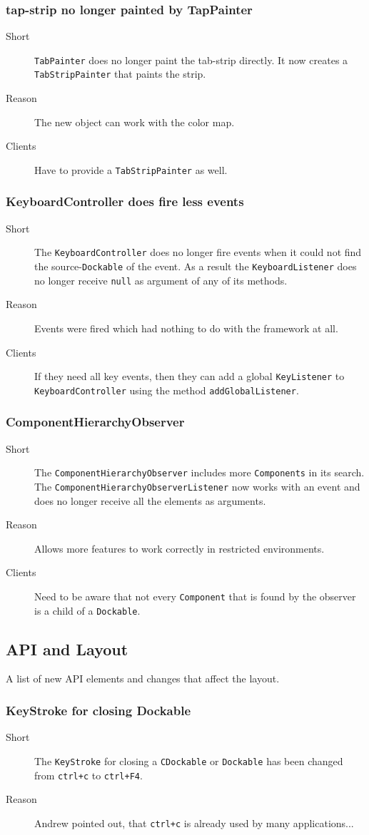 \documentclass[a4paper,10pt]{article}
\newcommand{\src}[1]{\lstinline[basicstyle=\normalsize\ttfamily,keywordstyle=\normalsize\ttfamily,identifierstyle=\normalsize\ttfamily]|#1|}
\newcommand{\short}{\item[Short]}
\newcommand{\why}{\item[Reason]}
\newcommand{\clients}{\item[Clients]}
\begin{document}
\subsubsection{tap-strip no longer painted by TapPainter}
\begin{description}
 \short \src{TabPainter} does no longer paint the tab-strip directly. It now creates a \src{TabStripPainter} that paints the strip.
 \why The new object can work with the color map.
 \clients Have to provide a \src{TabStripPainter} as well.
\end{description}

\subsubsection{KeyboardController does fire less events}
\begin{description}
 \short The \src{KeyboardController} does no longer fire events when it could not find the source-\src{Dockable} of the event. As a result the \src{KeyboardListener} does no longer receive \src{null} as argument of any of its methods.
 \why Events were fired which had nothing to do with the framework at all.
 \clients If they need all key events, then they can add a global \src{KeyListener} to \src{KeyboardController} using the method \src{addGlobalListener}.
\end{description}

\subsubsection{ComponentHierarchyObserver}
\begin{description}
 \short The \src{ComponentHierarchyObserver} includes more \src{Components} in its search. The \src{ComponentHierarchyObserverListener} now works with an event and does no longer receive all the elements as arguments.
 \why Allows more features to work correctly in restricted environments.
 \clients Need to be aware that not every \src{Component} that is found by the observer is a child of a \src{Dockable}.
\end{description}


\subsection{API and Layout}
A list of new API elements and changes that affect the layout.

\subsubsection{KeyStroke for closing Dockable}
\begin{description}
 \short The \src{KeyStroke} for closing a \src{CDockable} or \src{Dockable} has been changed from \src{ctrl+c} to \src{ctrl+F4}.
 \why Andrew pointed out, that \src{ctrl+c} is already used by many applications...
\end{description}
\end{document}
